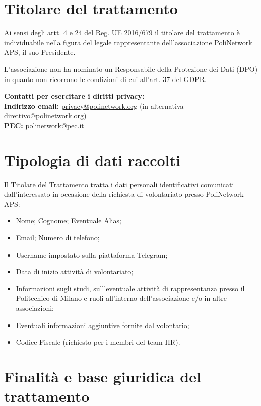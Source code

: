 \documentclass[legal]{polinetwork}
\begin{document}
\pnMakeHeader

\section{Titolare del trattamento}

Ai sensi degli artt. 4 e 24 del Reg. UE 2016/679 il titolare del trattamento è individuabile nella figura del legale rappresentante dell’associazione PoliNetwork APS, il suo Presidente.

L’associazione non ha nominato un Responsabile della Protezione dei Dati (DPO) in quanto non ricorrono le condizioni di cui all’art. 37 del GDPR.

\textbf{Contatti per esercitare i diritti privacy:} \\

\textbf{Indirizzo email:} \href{mailto:privacy@polinetwork.org}{privacy@polinetwork.org} (in alternativa \href{mailto:direttivo@polinetwork.org}{direttivo@polinetwork.org}) \\
\textbf{PEC:} \href{mailto:polinetwork@pec.it}{polinetwork@pec.it}

\section{Tipologia di dati raccolti}

Il Titolare del Trattamento tratta i dati personali identificativi comunicati dall’interessato in occasione della richiesta di volontariato presso PoliNetwork APS:

\begin{itemize}
	\item Nome; Cognome; Eventuale Alias;
	\item Email; Numero di telefono;
	\item Username impostato sulla piattaforma Telegram;
	\item Data di inizio attività di volontariato;
	\item Informazioni sugli studi, sull’eventuale attività di rappresentanza presso il Politecnico di Milano e ruoli all’interno dell’associazione e/o in altre associazioni;
	\item Eventuali informazioni aggiuntive fornite dal volontario;
	\item Codice Fiscale (richiesto per i membri del team HR).
\end{itemize}

\section{Finalità e base giuridica del trattamento}
\end{document}
